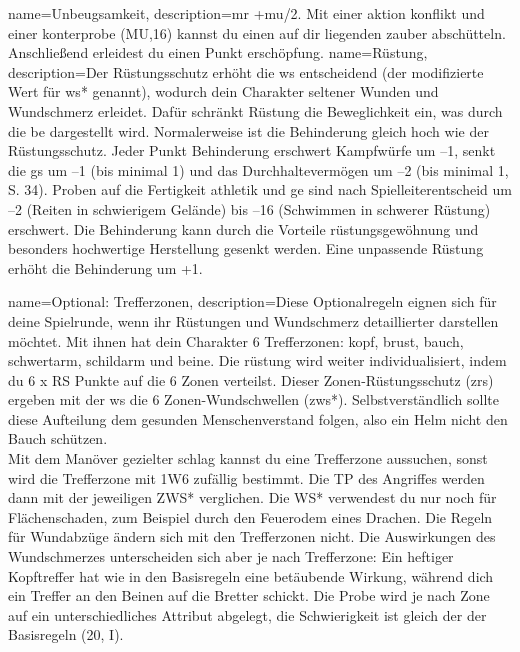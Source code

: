 {
    name={Unbeugsamkeit},
    description={\gls{mr} +\gls{mu}/2. Mit einer \gls{aktion} \gls{konflikt} und einer \gls{konterprobe} (MU,16) kannst du einen auf dir liegenden \gls{zauber} abschütteln. Anschließend erleidest du einen Punkt \gls{erschöpfung}.}}
{
    name={Rüstung},
description={Der Rüstungsschutz erhöht die \gls{ws} entscheidend (der modifizierte Wert für \gls{ws}* genannt), wodurch dein Charakter seltener Wunden und Wundschmerz erleidet. Dafür schränkt Rüstung die Beweglichkeit ein, was durch die \gls{be} dargestellt wird. Normalerweise ist die Behinderung gleich hoch wie der Rüstungsschutz. Jeder Punkt Behinderung erschwert Kampfwürfe um –1, senkt die \gls{gs} um –1 (bis minimal 1) und das Durchhaltevermögen um –2 (bis minimal 1, S. 34). Proben auf die Fertigkeit \gls{athletik} und \gls{ge} sind nach Spielleiterentscheid um –2 (Reiten in schwierigem Gelände) bis –16 (Schwimmen in schwerer Rüstung) erschwert. Die Behinderung kann durch die Vorteile \gls{rüstungsgewöhnung} und besonders hochwertige Herstellung gesenkt werden. Eine unpassende Rüstung erhöht die Behinderung um +1.}}

{
    name={Optional: Trefferzonen},
    description={Diese Optionalregeln eignen sich für deine Spielrunde, wenn ihr Rüstungen und Wundschmerz detaillierter darstellen möchtet. Mit ihnen hat dein Charakter 6 Trefferzonen: \gls{kopf}, \gls{brust}, \gls{bauch}, \gls{schwertarm}, \gls{schildarm} und \gls{beine}. Die \gls{rüstung} wird weiter individualisiert, indem du 6 x RS Punkte auf die 6 Zonen verteilst. Dieser Zonen-Rüstungsschutz (\gls{zrs}) ergeben mit der \gls{ws} die 6 Zonen-Wundschwellen (\gls{zws}*). Selbstverständlich sollte diese Aufteilung dem gesunden Menschenverstand folgen, also ein Helm nicht den Bauch schützen.\\
Mit dem Manöver \gls{gezielter schlag} kannst du eine Trefferzone aussuchen, sonst wird die Trefferzone mit 1W6 zufällig bestimmt. Die TP des Angriffes werden dann mit der jeweiligen ZWS* verglichen. Die WS* verwendest du nur noch für Flächenschaden, zum Beispiel durch den Feuerodem eines Drachen. Die Regeln für Wundabzüge ändern sich mit den Trefferzonen nicht. Die Auswirkungen des Wundschmerzes unterscheiden sich aber je nach Trefferzone: Ein heftiger Kopftreffer hat wie in den Basisregeln eine betäubende Wirkung, während dich ein Treffer an den Beinen auf die Bretter schickt. Die Probe wird je nach Zone auf ein unterschiedliches Attribut abgelegt, die Schwierigkeit ist gleich der der Basisregeln (20, I).}}

